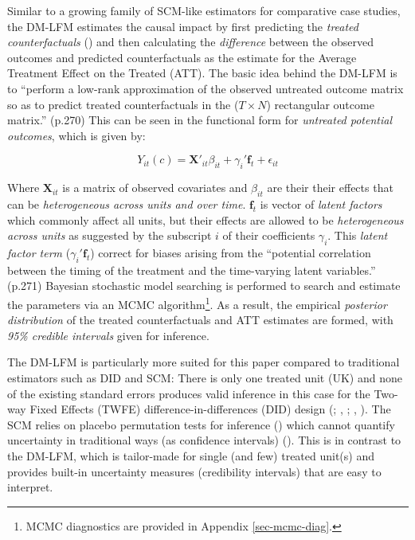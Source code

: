\documentclass[
  a4paper,
  abstract=true]{scrartcl}
\theoremstyle{definition}
\begin{document}
Similar to a growing family of SCM-like estimators for comparative case
studies, the DM-LFM estimates the causal impact by first predicting the
\emph{treated counterfactuals} () and then calculating the \emph{difference} between the
observed outcomes and predicted counterfactuals as the estimate for the
Average Treatment Effect on the Treated (ATT). The basic idea behind the
DM-LFM is to ``perform a low-rank approximation of the observed
untreated outcome matrix so as to predict treated counterfactuals in the
(\(T\times N\)) rectangular outcome matrix.'' (p.270) This can be seen
in the functional form for \emph{untreated potential outcomes}, which is
given by:

\[
Y_{it}(c)=\mathbf{X}'_{it}\beta_{it}+\gamma_{i}'\mathbf{f}_t+\epsilon_{it}
\]

Where \(\mathbf{X}_{it}\) is a matrix of observed covariates and
\(\beta_{it}\) are their their effects that can be \emph{heterogeneous
across units and over time}. \(\mathbf{f}_t\) is vector of \emph{latent
factors} which commonly affect all units, but their effects are allowed
to be \emph{heterogeneous across units} as suggested by the subscript
\(i\) of their coefficients \(\gamma_i\). This \emph{latent factor term}
(\(\gamma_{i}'\mathbf{f}_t\)) correct for biases arising from the
``potential correlation between the timing of the treatment and the
time-varying latent variables.'' (p.271) Bayesian stochastic model
searching is performed to search and estimate the parameters via an MCMC
algorithm\footnote{MCMC diagnostics are provided in Appendix
  \ref{sec-mcmc-diag}.}. As a result, the empirical \emph{posterior
distribution} of the treated counterfactuals and ATT estimates are
formed, with \emph{95\% credible intervals} given for inference.

The DM-LFM is particularly more suited for this paper compared to
traditional estimators such as DID and SCM: There is only one treated
unit (UK) and none of the existing standard errors produces valid
inference in this case for the Two-way Fixed Effects (TWFE)
difference-in-differences (DID) design (; ,
;
,
). The SCM relies on placebo
permutation tests for inference () which cannot quantify uncertainty in traditional ways (as
confidence intervals) (). This
is in contrast to the DM-LFM, which is tailor-made for single (and few)
treated unit(s) and provides built-in uncertainty measures (credibility
intervals) that are easy to interpret.
\end{document}
